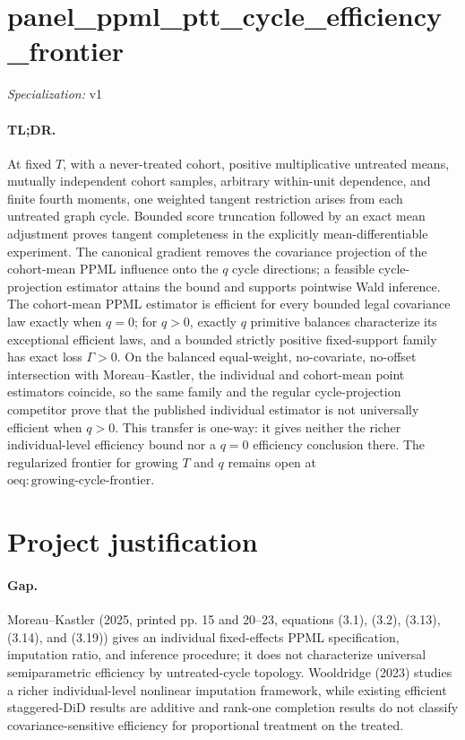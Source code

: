\documentclass{article}
\begin{document}
\sloppy

\section*{panel\_\allowbreak{}ppml\_\allowbreak{}ptt\_\allowbreak{}cycle\_\allowbreak{}efficiency\_\allowbreak{}frontier}

\noindent\textit{Specialization:} v1\par

\paragraph{TL;DR.} At fixed \(T\), with a never-treated cohort, positive multiplicative untreated means, mutually independent cohort samples, arbitrary within-unit dependence, and finite fourth moments, one weighted tangent restriction arises from each untreated graph cycle. Bounded score truncation followed by an exact mean adjustment proves tangent completeness in the explicitly mean-differentiable experiment. The canonical gradient removes the covariance projection of the cohort-mean PPML influence onto the \(q\) cycle directions; a feasible cycle-projection estimator attains the bound and supports pointwise Wald inference. The cohort-mean PPML estimator is efficient for every bounded legal covariance law exactly when \(q=0\); for \(q>0\), exactly \(q\) primitive balances characterize its exceptional efficient laws, and a bounded strictly positive fixed-support family has exact loss \(\Gamma>0\). On the balanced equal-weight, no-covariate, no-offset intersection with Moreau--Kastler, the individual and cohort-mean point estimators coincide, so the same family and the regular cycle-projection competitor prove that the published individual estimator is not universally efficient when \(q>0\). This transfer is one-way: it gives neither the richer individual-level efficiency bound nor a \(q=0\) efficiency conclusion there. The regularized frontier for growing \(T\) and \(q\) remains open at \(\mathrm{oeq{:}growing\text{-}cycle\text{-}frontier}\).

\section{Project justification}

\paragraph{Gap.} Moreau--Kastler (2025, printed pp. 15 and 20--23, equations (3.1), (3.2), (3.13), (3.14), and (3.19)) gives an individual fixed-effects PPML specification, imputation ratio, and inference procedure; it does not characterize universal semiparametric efficiency by untreated-cycle topology. Wooldridge (2023) studies a richer individual-level nonlinear imputation framework, while existing efficient staggered-DiD results are additive and rank-one completion results do not classify covariance-sensitive efficiency for proportional treatment on the treated.
\end{document}
